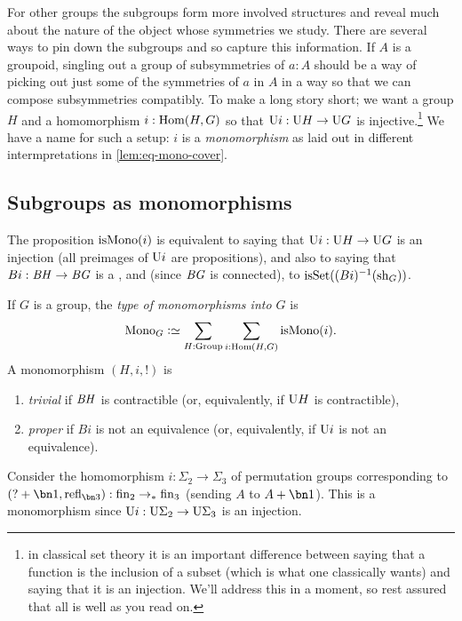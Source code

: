 For other groups the subgroups form more involved structures and reveal much about the nature of the object whose symmetries we study.
There are several ways to pin down the subgroups and so capture this information.
If $A$ is a groupoid, singling out a group of subsymmetries of $a:A$ should be a way of picking out just some of the symmetries of $a$ in $A$ in a way so that we can compose subsymmetries compatibly.  To make a long story short; we want a group $H$ and a homomorphism $i:\Hom(H,G)$ so that $\mathrm{U} i:\mathrm{U} H\to\mathrm{U} G$ is injective.\footnote{in classical set theory it is an important difference between saying that a function is the inclusion of a subset (which is what one classically wants) and saying that it is an injection.  We'll address this in a moment, so rest assured that all is well as you read on.}  We have a name for such a setup: $i$ is a \emph{monomorphism} as laid out in different intermpretations in \cref{lem:eq-mono-cover}.

\subsection{Subgroups as monomorphisms}

The proposition $\ismono(i)$ is equivalent to saying that $\mathrm{U} i:\mathrm{U} H\to \mathrm{U} G$ is an injection (all preimages of $\mathrm{U} i$ are propositions), and also to saying that $B i:\mathit{B}\mathit{H}\to\mathit{B}\mathit{G}$ is a \covering, and (since $\mathit{B}\mathit{G}$ is connected), to $\isset((Bi)^{-1}(\sh_G))$.
\begin{definition}
  \label{def:typeofmono}
  If $G$ is a group, the \emph{type of monomorphisms into $G$} is
  $$\typemono_G\defequi\sum_{H:\typegroup}\sum_{i:\Hom(H,G)}\ismono(i).$$
  A monomorphism $(H,i,!)$ is
      \begin{enumerate}
      \item \emph{trivial} if $\mathit{B}\mathit{H}$ is contractible (or, equivalently, if $\mathrm{U} H$ is contractible),
      \item \emph{proper} if $Bi$ is not an equivalence (or, equivalently, if $\mathrm{U} i$ is not an equivalence).
      \end{enumerate}
\end{definition}

\begin{example}
  \label{ex:sigma2inSigma3}
  Consider the  homomorphism $i:\Sigma_2\to\Sigma_3$ of permutation groups corresponding to $(?+\bn 1,\refl{\bn 3}):\fin_2\to_*\fin_3$ (sending $A$ to $A+\bn 1$).  This is a monomorphism since $\mathrm{U} i:\mathrm{U}\Sigma_2\to\mathrm{U}\Sigma_3$ is an injection.
\end{example}

